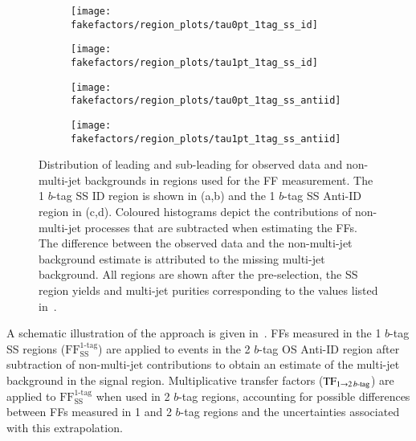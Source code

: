 \begin{figure}[htbp]
  \centering

  \begin{subfigure}{0.49\textwidth}
    \texttt{[image: fakefactors/region\_plots/tau0pt\_1tag\_ss\_id]}
  \end{subfigure}
  \begin{subfigure}{0.49\textwidth}
    \texttt{[image: fakefactors/region\_plots/tau1pt\_1tag\_ss\_id]}
  \end{subfigure}

  \begin{subfigure}{0.49\textwidth}
    \texttt{[image: fakefactors/region\_plots/tau0pt\_1tag\_ss\_antiid]}
  \end{subfigure}
  \begin{subfigure}{0.49\textwidth}
    \texttt{[image: fakefactors/region\_plots/tau1pt\_1tag\_ss\_antiid]}
  \end{subfigure}

  \caption{Distribution of leading and sub-leading \tauhadvis \pT for observed
    data and non-multi-jet backgrounds in regions used for the FF
    measurement. The 1 $b$-tag SS ID region is shown in (a,b) and the 1 $b$-tag
    SS Anti-ID region in (c,d). Coloured histograms depict the contributions of
    non-multi-jet processes that are subtracted when estimating the FFs. The
    difference between the observed data and the non-multi-jet background
    estimate is attributed to the missing multi-jet background. All regions are
    shown after the pre-selection, the SS region yields and multi-jet purities
    corresponding to the values listed in~.}%
  \label{fig:mjfakes_1tag_ss_plots}
\end{figure}

A schematic illustration of the approach is given
in~. FFs measured in the 1 $b$-tag SS regions
($\text{FF}_\text{SS}^\text{1-tag}$) are applied to events in the 2 $b$-tag OS
Anti-ID region after subtraction of non-multi-jet contributions to obtain an
estimate of the multi-jet background in the signal region. Multiplicative
transfer factors ($\text{TF}_{1 \rightarrow 2\,b\text{-tag}}$) are applied to
$\text{FF}_\text{SS}^\text{1-tag}$ when used in 2 $b$-tag regions, accounting
for possible differences between FFs measured in 1 and 2 $b$-tag regions and the
uncertainties associated with this extrapolation.

